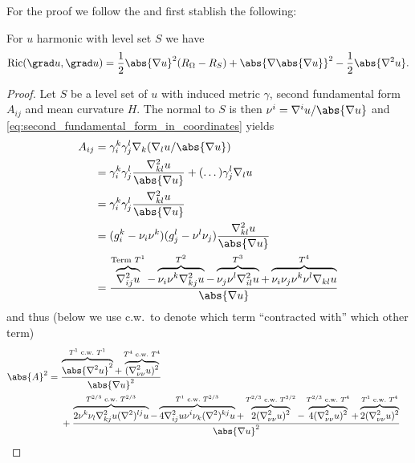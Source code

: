 \documentclass[titlepage,numbers=noenddot,oneside,%
cleardoublepage=empty,paper=a4,fontsize=11pt,%
english,%
]{scrartcl}
\newcommand{\Ricci}{\mathrm{Ric}} %
\begin{document}
{For the proof we follow the \cite[Proof of Proposition 4.2 in][]{brayHarmonicFunctionsMass2019} and first stablish the following:
\begin{lemma}\label{lem:main_identity}
    For \( u \) harmonic with level set \( S \) we have
    \begin{equation*}
        \Ricci(\grad u, \grad u)=\frac{1}{2}\abs{\nabla u}^2(R_\Omega-R_S)+\abs{\nabla\abs{\nabla u}}^2-\frac{1}{2}\abs{\nabla^2 u}.
    \end{equation*}
\end{lemma}
\begin{proof}  
    Let \( S \) be a level set of \( u \) with induced metric \( \gamma \), second fundamental form \( A_{ij} \) and mean curvature \( H \). The normal to \( S \) is then \( \nu^i=\nabla^i u/\abs{\nabla u} \) and \cref{eq:second_fundamental_form_in_coordinates} yields
    \begin{equation*}
        \begin{aligned}[t]
            A_{ij}&=\gamma^{k}_i\gamma^l_j \nabla_k (\nabla_l u/\abs{\nabla u})\\
            &=\gamma^{k}_i \gamma^{l}_j\frac{\nabla^2_{kl}u}{\abs{\nabla u}}+(\dotsc)\gamma^l_j\nabla_l u \\
            &=\gamma^{k}_i \gamma^l_j \frac{\nabla^2_{kl}u}{\abs{\nabla u}}\\
            &=(g^k_i-\nu_i \nu^k)(g^l_j - \nu^l \nu_j)\frac{\nabla^2_{kl}u}{\abs{\nabla u}}\\
            &=\frac{\overbrace{\nabla^2_{ij}u}^{    \text{Term \( T^1 \)}}-\overbrace{\nu_i \nu^k\nabla^2_{kj}u}^{T^2}-\overbrace{\nu_j \nu^l\nabla^2_{il}u}^{T^3}+\overbrace{\nu_i \nu_j \nu^k \nu^l\nabla_{kl}u}^{T^4}}{\abs{\nabla u}}
        \end{aligned}
    \end{equation*}
    and thus (below we use c.w.~to denote which term \enquote{contracted with} which other term)
    \newcommand{\cw}{\text{~c.w.~}}
    \begin{equation*}
        \begin{aligned}[t]
            \abs{A}^2&=\begin{aligned}[t]
                &\frac{\overbrace{\abs{\nabla^2 u}^2}^{T^1\cw T^1}+\overbrace{(\nabla^2_{\nu\nu}u)^2}^{T^4\cw T^4}}{\abs{\nabla u}^2}\\
            &+\frac{\overbrace{2\nu^k \nu_l \nabla^2_{kj}u (\nabla^2)^{lj}u}^{T^{2/3}\cw T^{2/3}}-\overbrace{4\nabla^2_{ij}u \nu^i \nu_k (\nabla^2)^{kj}u}^{T^{1}\cw T^{2/3}}+\overbrace{2(\nabla^2_{\nu\nu}u)^2}^{T^{2/3}\cw T^{3/2}}-\overbrace{4(\nabla^2_{\nu\nu}u)^2}^{T^{2/3}\cw T^{4}}+\overbrace{2(\nabla^2_{\nu\nu}u)^2}^{T^{1}\cw T^{4}}}{\abs{\nabla u}^2}

\end{aligned}
\end{aligned}
\end{equation*}
\end{proof}}
\end{document}
